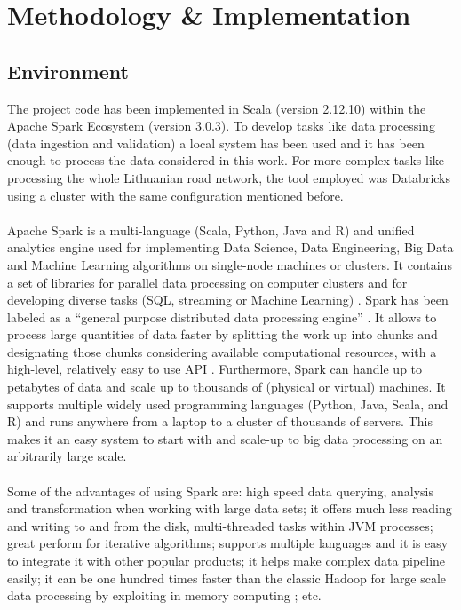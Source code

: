 \chapter{Methodology \& Implementation} \label{ch:method}
\section{Environment}
\label{sec:environment}

The project code has been implemented in Scala (version 2.12.10) within the Apache Spark Ecosystem (version 3.0.3). 
To develop tasks like data processing (data ingestion and validation) a local system has been used and it has been enough to process the data considered in this work. For more complex tasks like processing the whole Lithuanian road network, the tool employed was Databricks using a cluster with the same configuration mentioned before. 
\\
\\
Apache Spark \cite{spark} is a multi-language (Scala, Python, Java and R) and unified analytics engine used for implementing Data Science, Data Engineering, Big Data and Machine Learning algorithms on single-node machines or clusters. It contains a set of libraries for parallel data processing on computer clusters and for developing diverse tasks (SQL, streaming or Machine Learning) \cite{spark-guide}. 
Spark has been labeled as a “general purpose distributed data processing engine” \cite{spark}. It allows to process large quantities of data faster by splitting the work up into chunks and designating those chunks considering available computational resources, with a high-level, relatively easy to use API \cite{hihg-spark}. Furthermore, Spark can handle up to petabytes of data and scale up to thousands of (physical or virtual) machines.
It supports multiple widely used programming languages (Python, Java, Scala, and R) and runs anywhere from a laptop to a cluster of thousands of servers. This makes it an easy system to start with and scale-up to big data processing on an arbitrarily large scale.
\\
\\
Some of the advantages of using Spark are: high speed data querying, analysis and transformation when working with large data sets; it offers much less reading and writing to and from the disk, multi-threaded tasks within \ac{JVM} processes; great perform for iterative algorithms; supports multiple languages and it is easy to integrate it with other popular products; it helps make complex data pipeline easily; it can be one hundred times faster than the classic Hadoop for large scale data processing by exploiting in memory computing \cite{spark}; etc.
